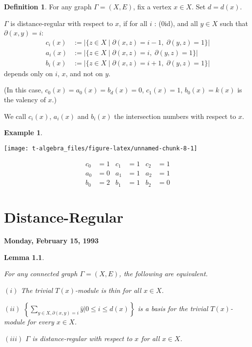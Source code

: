\documentclass[
]{book}
\newtheorem{lemma}{Lemma}[chapter]
\theoremstyle{definition}
\newtheorem{definition}{Definition}[chapter]
\theoremstyle{definition}
\newtheorem{example}{Example}[chapter]
\theoremstyle{definition}
\theoremstyle{definition}
\theoremstyle{remark}
\begin{document}
\begin{definition}
\protect\hypertarget{def:distance-regular}{}\label{def:distance-regular}For any graph \(\Gamma = (X, E)\), fix a vertex \(x\in X\). Set \(d = d(x)\).

\(\Gamma\) is distance-regular  with respect to \(x\), if for all \(i\) : (0\leq i\leq d), and all \(y\in X\) such that \(\partial(x,y) = i\):
\begin{align}
c_i(x) & := |\{z\in X \mid \partial(x,z) = i-1, \; \partial(y,z) = 1\}|\\
a_i(x) & := |\{z\in X \mid \partial(x,z) = i, \; \partial(y,z) = 1\}|\\
b_i(x) & := |\{z\in X \mid \partial(x,z) = i+1, \; \partial(y,z) = 1\}|
\end{align}
depends only on \(i\), \(x\), and not on \(y\).

(In this case, \(c_0(x) = a_0(x) = b_d(x) = 0\), \(c_1(x) = 1\), \(b_0(x) = k(x)\) is the valency of \(x\).)

We call \(c_i(x)\), \(a_i(x)\) and \(b_i(x)\) the intersection numbers with respect to \(x\).
\end{definition}

\begin{example}
\leavevmode

\begin{center}\texttt{[image: t-algebra\_files/figure-latex/unnamed-chunk-8-1]} \end{center}

\begin{align}
c_0 &= 1 & c_1 &= 1 & c_2 &= 1\\
a_0 &= 0 & a_1 &= 1 & a_2 &= 1\\
b_0 &= 2 & b_1 &= 1 & b_2 &= 0
\end{align}

\end{example}

\hypertarget{lec12}{%
\chapter{Distance-Regular}\label{lec12}}

\textbf{Monday, February 15, 1993}

\begin{lemma}
\protect\hypertarget{lem:distance-reguarity}{}\label{lem:distance-reguarity}

For any connected graph \(\Gamma = (X, E)\), the following are equivalent.

\((i)\) The trivial \(T(x)\)-module is thin for all \(x\in X\).

\((ii)\) \(\displaystyle{\left\{\sum_{y\in X, \partial(x,y) = i}\hat{y} \left| 0\leq i\leq d(x)\right.\right\}}\) is a basis for the trivial \(T(x)\)-module for every \(x\in X\).

\((iii)\) \(\Gamma\) is distance-regular with respect to \(x\) for all \(x\in X\).

\end{lemma}
\end{document}
